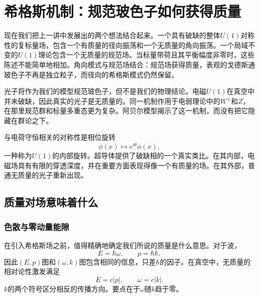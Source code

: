 \chapter{希格斯机制：规范玻色子如何获得质量}

现在我们把上一讲中发展出的两个想法结合起来。一个具有破缺的整体\(U(1)\)对称性的复标量场，包含一个有质量的径向振荡和一个无质量的角向振荡。一个局域不变的\(U(1)\)理论包含一个无质量的规范场。当标量带荷且其平衡幅度非零时，这些陈述不能简单地相加。角向模式与规范场结合：规范场获得质量，表观的戈德斯通玻色子不再是独立粒子，而径向的希格斯模式仍然保留。

光子将作为我们的模型规范玻色子，但不是我们的物理结论。电磁\(U(1)\)在真空中并未破缺，因此真实的光子是无质量的。同一机制作用于电弱理论中的\(W^\pm\)和\(Z\)，在那里规范群和标量多重态更为复杂。阿贝尔模型揭示了这一机制，而没有把它隐藏在群论之下。

\begin{classroomqa}
\end{classroomqa}

与电荷守恒相关的对称性是相位旋转
\begin{equation}
  \phi(x)\longmapsto e^{i\theta}\phi(x),
\end{equation}
一种称为\(U(1)\)的内部旋转。超导体提供了破缺相的一个真实类比。在其内部，电磁场具有有限的穿透深度，并在重要方面表现得像一个有质量的场。在其外部，普通无质量的光子重新出现。

\section{质量对场意味着什么}

\subsection{色散与零动量能隙}

在引入希格斯场之前，值得精确地确定我们所说的质量是什么意思。对于波，
\begin{equation}
  E=\hbar\omega,
  \qquad
  p=\hbar k,
  \label{eq:l08-quantum-wave}
\end{equation}
因此\((E,p)\)图和\((\omega,k)\)图包含相同的信息，只差\(\hbar\)的因子。在真空中，无质量的相对论性激发满足
\begin{equation}
  E=c|p|,
  \qquad
  \omega=c|k|.
  \label{eq:l08-massless-dispersion}
\end{equation}
\(k\)的两个符号区分相反的传播方向。要点在于\(\omega\)随\(k\)趋于零。

